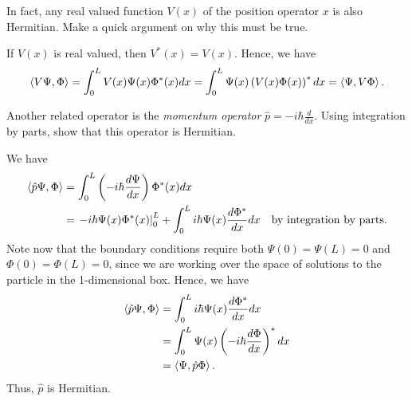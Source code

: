 \documentclass[12pt]{article} %
\begin{document}
\newpage
\begin{problem}
	In fact, any real valued function $V(x)$ of the position operator $x$ is also Hermitian. Make a quick argument on why this must be true.
\end{problem}
\begin{solution}
	If $V(x)$ is real valued, then $V^*(x)=V(x)$.  Hence, we have
	\[
	\left\langle V\Psi, \Phi \right\rangle = \int_0^L V(x)\Psi(x)\Phi^*(x)dx = \int_0^L \Psi(x)\left(V(x)\Phi(x)\right)^*dx = \left\langle \Psi, V\Phi \right\rangle.
	\]
\end{solution}

\newpage
\begin{problem}
	Another related operator is the \emph{momentum operator} $\hat{p} = -i\hbar \frac{d}{dx}$. Using integration by parts, show that this operator is Hermitian.
\end{problem}
\begin{solution}
We have
\begin{align*}
	\left\langle \hat{p} \Psi, \Phi \right\rangle &= \int_0^L \left(-i\hbar \frac{d \Psi}{dx}\right)\Phi^*(x)dx\\
	&= \left.-i\hbar \Psi(x)\Phi^*(x)  \right\vert_0^L + \int_0^L i\hbar \Psi(x) \frac{d\Phi^*}{dx}dx & \textrm{by integration by parts}.
\end{align*}
Note now that the boundary conditions require both $\Psi(0)=\Psi(L)=0$ and $\Phi(0)=\Phi(L)=0$, since we are working over the space of solutions to the particle in the 1-dimensional box.  Hence, we have
\begin{align*}
	\left\langle \hat{p}\Psi, \Phi \right\rangle &= \int_0^L i\hbar \Psi(x) \frac{d\Phi^*}{dx}dx\\
	&= \int_0^L \Psi(x)\left(-i\hbar \frac{d\Phi}{dx}\right)^* dx \\
	&= \left\langle \Psi, \hat{p}\Phi \right\rangle.
\end{align*}
Thus, $\hat{p}$ is Hermitian.
\end{solution}
\end{document}

